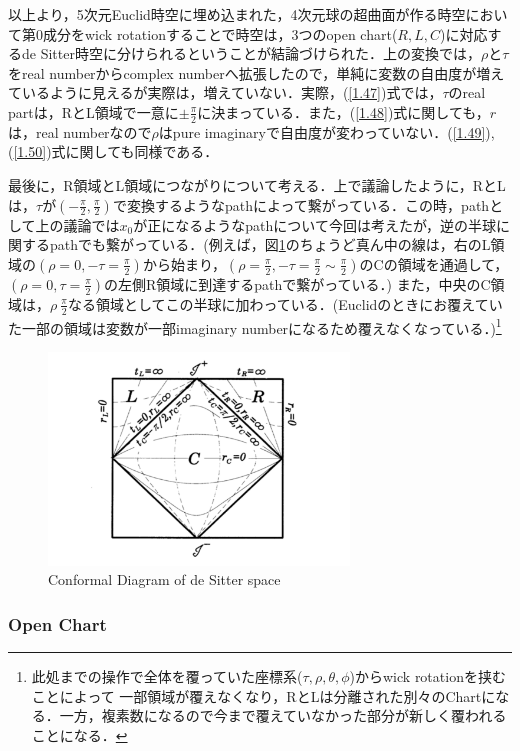 以上より，5次元Euclid時空に埋め込まれた，4次元球の超曲面が作る時空において第$0$成分をwick rotationすることで時空は，3つのopen chart($R,L,C$)に対応するde Sitter時空に分けられるということが結論づけられた．上の変換では，$\rho$と$\tau$をreal numberからcomplex numberへ拡張したので，単純に変数の自由度が増えているように見えるが実際は，増えていない．実際，(\ref{1.47})式では，$\tau$のreal partは，RとL領域で一意に$\pm\frac{\pi}{2}$に決まっている．また，(\ref{1.48})式に関しても，$r$は，real numberなので$\rho$はpure imaginaryで自由度が変わっていない．(\ref{1.49}),(\ref{1.50})式に関しても同様である．

最後に，R領域とL領域につながりについて考える．上で議論したように，RとLは，$\tau$が$(-\frac{\pi}{2},\frac{\pi}{2})$で変換するようなpathによって繋がっている．この時，pathとして上の議論では$x_0$が正になるようなpathについて今回は考えたが，逆の半球に関するpathでも繋がっている．(例えば，図\ref{desRL}のちょうど真ん中の線は，右のL領域の$(\rho=0,-\tau=\frac{\pi}{2})$から始まり，$(\rho=\frac{\pi}{2},-\tau=\frac{\pi}{2}\sim\frac{\pi}{2})$のCの領域を通過して，$(\rho=0,\tau=\frac{\pi}{2})$の左側R領域に到達するpathで繋がっている．)
また，中央のC領域は，$\rho~\frac{\pi}{2}$なる領域としてこの半球に加わっている．(Euclidのときにお覆えていた一部の領域は変数が一部imaginary numberになるため覆えなくなっている．)\footnote{此処までの操作で全体を覆っていた座標系($\tau,\rho,\theta,\phi$)からwick rotationを挟むことによって
一部領域が覆えなくなり，RとLは分離された別々のChartになる．一方，複素数になるので今まで覆えていなかった部分が新しく覆われることになる．}

\begin{figure}[H]
  \begin{center}
  \includegraphics[width=8cm,angle=270]{desRL.pdf}
  \caption{Conformal Diagram of de Sitter space}
    \label{desRL}
  \end{center}
\end{figure}

\subsubsection{Open Chart}
